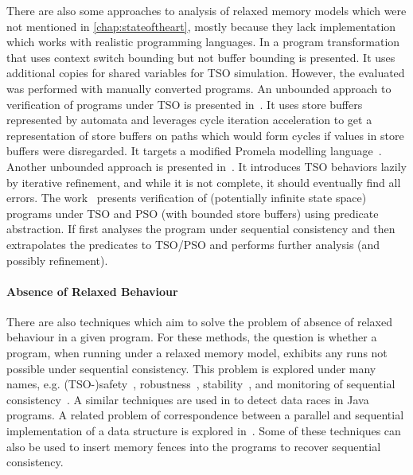 There are also some approaches to analysis of relaxed memory models which were not mentioned in \autoref{chap:stateoftheart}, mostly because they lack implementation which works with realistic programming languages.
In  a program transformation that uses context switch bounding but not buffer bounding is presented. It uses additional copies for shared variables for TSO simulation. However, the evaluated was performed with manually converted programs.
An unbounded approach to verification of programs under TSO is presented in~.
It uses store buffers represented by automata and leverages cycle iteration acceleration to get a representation of store buffers on paths which would form cycles if values in store buffers were disregarded.
It targets a modified Promela modelling language~.
Another unbounded approach is presented in~.
It introduces TSO behaviors lazily by iterative refinement, and while it is not complete, it should eventually find all errors.
The work~ presents verification of (potentially infinite state space) programs under TSO and PSO (with bounded store buffers) using predicate abstraction. If first analyses the program under sequential consistency and then extrapolates the predicates to TSO/PSO and performs further analysis (and possibly refinement).

\paragraph{Absence of Relaxed Behaviour}

There are also techniques which aim to solve the problem of absence of relaxed behaviour in a given program.
For these methods, the question is whether a program, when running under a relaxed memory model, exhibits any runs not possible under sequential consistency.
This problem is explored under many names, e.g. (TSO-)safety~, robustness~, stability~, and monitoring of sequential consistency~.
A similar techniques are used in  to detect data races in Java programs.
A related problem of correspondence between a parallel and sequential implementation of a data structure is explored in~.
Some of these techniques can also be used to insert memory fences into the programs to recover sequential consistency.

